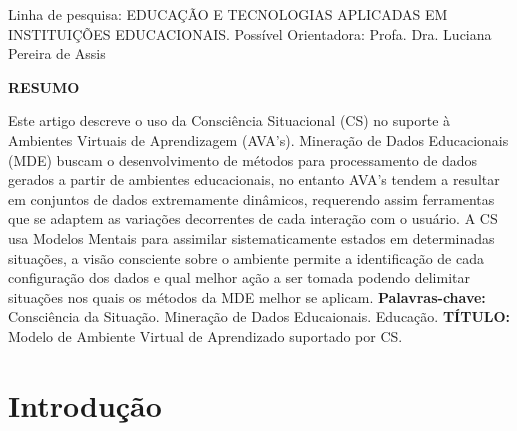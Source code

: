 \documentclass[
	oneside,
	12pt,				%
	a4paper,			%
	english,			%
	brazil,				%
	article
	]{abntex2}
\renewcommand{\imprimircapa}{%
	\begin{capa}%
		\center	
		{\ABNTEXchapterfont\imprimirpreambulo}
		\vfill
		\begin{center}
			\ABNTEXchapterfont\bfseries\imprimirtitulo
		\end{center}
		\vspace*{3cm}
		\begin{flushright}
		Linha de pesquisa: EDUCAÇÃO E TECNOLOGIAS APLICADAS EM INSTITUIÇÕES
		EDUCACIONAIS.
		\linebreak
		Possível Orientadora: Profa. Dra. Luciana Pereira de Assis
		\end{flushright}
		\vfill
		\imprimirlocal 
		\linebreak		
		\imprimirdata
		\vspace*{1cm}
	\end{capa}
}
\begin{document}
 

\frenchspacing 

\imprimircapa

\textual

\OnehalfSpacing %
\begin{center}
	\ABNTEXchapterfont\bfseries RESUMO
\end{center}

Este artigo descreve o uso da Consciência Situacional (CS) no suporte à Ambientes Virtuais de Aprendizagem (AVA’s). Mineração de Dados Educacionais (MDE) buscam o desenvolvimento de métodos para processamento
de dados gerados a partir de ambientes educacionais, no entanto AVA’s tendem a resultar em conjuntos de dados extremamente dinâmicos, requerendo assim ferramentas que se adaptem as variações decorrentes de cada interação com
o usuário. A CS usa Modelos Mentais para assimilar sistematicamente estados em determinadas situações, a visão consciente sobre o ambiente permite a identificação de cada configuração dos dados e qual melhor ação a ser tomada
podendo delimitar situações nos quais os métodos da MDE melhor se aplicam.
\linebreak\linebreak
\textbf{Palavras-chave:} Consciência da Situação. Mineração de Dados Educaionais. Educação.
\linebreak\linebreak
\textbf{TÍTULO:} Modelo de Ambiente Virtual de Aprendizado suportado por CS.


\section{Introdução}
\end{document}
